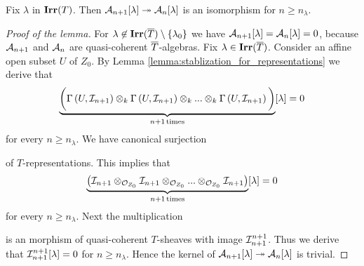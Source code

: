 \begin{lemma}\label{lemma:stabilization_for_formal_schemes}
Fix $\lambda$ in $\mathbf{Irr}(T)$. Then ${\mathcal A}_{n+1}[\lambda]\twoheadrightarrow {\mathcal A}_n[\lambda]$ is an isomorphism for $n \geq  n_{\lambda}$.
\end{lemma}
\begin{proof}[Proof of the lemma]
For $\lambda \not \in \mathbf{Irr}(\overline{T})\setminus \{\lambda_0\}$ we have ${\mathcal A}_{n+1}[\lambda] = {\mathcal A}_n[\lambda] = 0$, because ${\mathcal A}_{n+1}$ and ${\mathcal A}_n$ are quasi-coherent $\overline{T}$-algebras. Fix $\lambda \in \mathbf{Irr}(\overline{T})$. Consider an affine open subset $U$ of $Z_0$. By Lemma \ref{lemma:stablization_for_representations} we derive that
$$\underbrace{\bigg(\Gamma\left(U,{\mathcal I}_{n+1}\right) \otimes_{k} \Gamma\left(U, {\mathcal I}_{n+1}\right) \otimes_{k}...\otimes_{k}\Gamma\left(U,{\mathcal I}_{n+1}\right)\bigg)}_{n+1\,\mathrm{times}}[\lambda] = 0$$
for every $n \geq n_{\lambda}$. We have canonical surjection
\begin{center}
\end{center}
of $T$-representations. This implies that
$$\underbrace{\left({\mathcal I}_{n+1} \otimes_{{\mathcal O}_{Z_0}} {\mathcal I}_{n+1} \otimes_{{\mathcal O}_{Z_0}}...\otimes_{{\mathcal O}_{Z_0}} {\mathcal I}_{n+1}\right)}_{n+1\,\mathrm{times}}[\lambda] = 0$$
for every $n \geq n_{\lambda}$. Next the multiplication
\begin{center}
\end{center}
is an morphism of quasi-coherent $T$-sheaves with image ${\mathcal I}_{n+1}^{n+1}$. Thus we derive that ${\mathcal I}_{n+1}^{n+1}[\lambda]=0$ for $n \geq n_{\lambda}$. Hence the kernel of ${\mathcal A}_{n+1}[\lambda]\twoheadrightarrow {\mathcal A}_n[\lambda]$ is trivial.
\end{proof}

